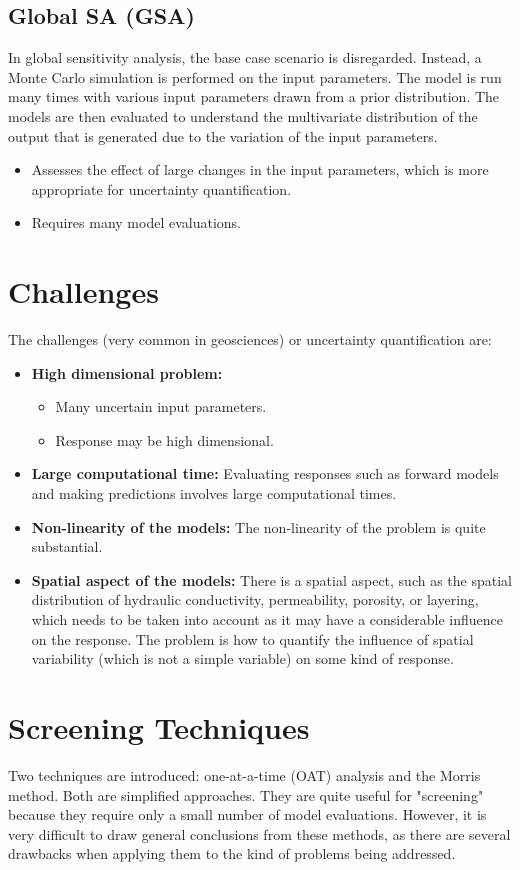 \subsection{Global SA (GSA)}
In global sensitivity analysis, the base case scenario is disregarded. Instead, a Monte Carlo simulation is performed on the input parameters. The model is run many times with various input parameters drawn from a prior distribution. The models are then evaluated to understand the multivariate distribution of the output that is generated due to the variation of the input parameters.

\begin{itemize}
    \item Assesses the effect of large changes in the input parameters, which is more appropriate for uncertainty quantification.
    \item Requires many model evaluations.
\end{itemize}

\section{Challenges}
The challenges (very common in geosciences) or uncertainty quantification are:
\begin{itemize}
    \item \textbf{High dimensional problem:}
    \begin{itemize}
        \item Many uncertain input parameters.
        \item Response may be high dimensional.
    \end{itemize}
    \item \textbf{Large computational time:} Evaluating responses such as forward models and making predictions involves large computational times.
    \item \textbf{Non-linearity of the models:} The non-linearity of the problem is quite substantial.
    \item \textbf{Spatial aspect of the models:} There is a spatial aspect, such as the spatial distribution of hydraulic conductivity, permeability, porosity, or layering, which needs to be taken into account as it may have a considerable influence on the response. The problem is how to quantify the influence of spatial variability (which is not a simple variable) on some kind of response.
\end{itemize}

\section{Screening Techniques}
Two techniques are introduced: one-at-a-time (OAT) analysis and the Morris method. Both are simplified approaches. They are quite useful for "screening" because they require only a small number of model evaluations. However, it is very difficult to draw general conclusions from these methods, as there are several drawbacks when applying them to the kind of problems being addressed.
